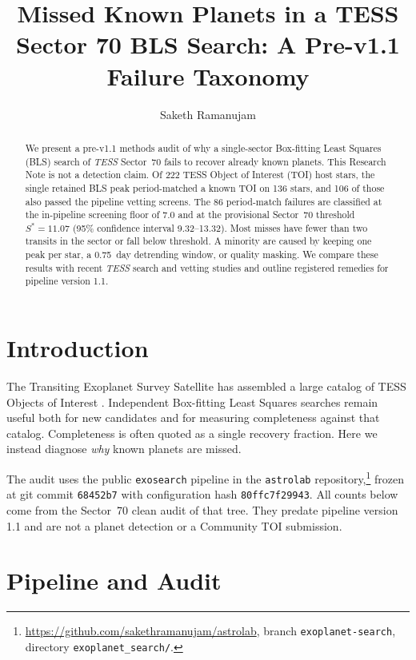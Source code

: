 \documentclass[RNAAS]{aastex631}
\begin{document}
\title{Missed Known Planets in a TESS Sector 70 BLS Search: A Pre-v1.1 Failure Taxonomy}

\author{Saketh Ramanujam}

\begin{abstract}
We present a pre-v1.1 methods audit of why a single-sector Box-fitting Least Squares (BLS) search of \textit{TESS} Sector~70 fails to recover already known planets. This Research Note is not a detection claim. Of 222 TESS Object of Interest (TOI) host stars, the single retained BLS peak period-matched a known TOI on 136 stars, and 106 of those also passed the pipeline vetting screens. The 86 period-match failures are classified at the in-pipeline screening floor of 7.0 and at the provisional Sector~70 threshold $S^{*}=11.07$ (95\% confidence interval 9.32--13.32). Most misses have fewer than two transits in the sector or fall below threshold. A minority are caused by keeping one peak per star, a 0.75~day detrending window, or quality masking. We compare these results with recent \textit{TESS} search and vetting studies and outline registered remedies for pipeline version 1.1.
\end{abstract}

\section{Introduction}

The Transiting Exoplanet Survey Satellite \citep[\textit{TESS};][]{ricker15} has assembled a large catalog of TESS Objects of Interest \citep[TOIs;][]{guerrero21}. Independent Box-fitting Least Squares \citep[BLS;][]{kovacs02} searches remain useful both for new candidates and for measuring completeness against that catalog. Completeness is often quoted as a single recovery fraction. Here we instead diagnose \emph{why} known planets are missed.

The audit uses the public \texttt{exosearch} pipeline in the \texttt{astrolab} repository,\footnote{\url{https://github.com/sakethramanujam/astrolab}, branch \texttt{exoplanet-search}, directory \texttt{exoplanet\_search/}.} frozen at git commit \texttt{68452b7} with configuration hash \texttt{80ffc7f29943}. All counts below come from the Sector~70 clean audit of that tree. They predate pipeline version 1.1 and are not a planet detection or a Community TOI submission.

\section{Pipeline and Audit}
\end{document}
